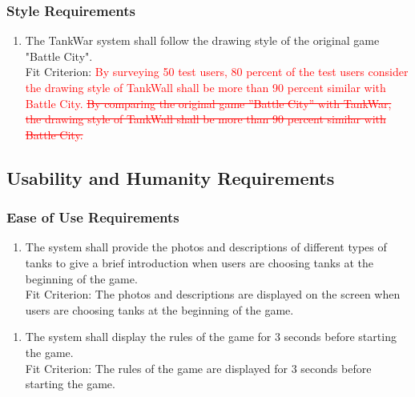 \documentclass[12pt, titlepage]{article}
\begin{document}
\subsubsection{Style Requirements}
\label{ssub:style_requirements}
\begin{enumerate}[{LF}8. ]
	\item The TankWar system shall follow the drawing style of the original game "Battle City".
	\\
	
	Fit Criterion: \textcolor{red}{By surveying 50 test users, 80 percent of the test users consider the drawing style of TankWall shall be more than 90 percent similar with Battle City. \sout{By comparing the original game ”Battle City” with TankWar, the drawing style of TankWall shall be more than 90 percent similar with Battle City.}}

\end{enumerate}

\subsection{Usability and Humanity Requirements}
\label{sub:usability_and_humanity_requirements}

\subsubsection{Ease of Use Requirements}
\label{ssub:ease_of_use_requirements}
\begin{enumerate}[{UH}1. ]
	\item The system shall provide the photos and descriptions of different types of tanks to give a brief introduction when users are choosing tanks at the beginning of the game.
	\\
	
	Fit Criterion: The photos and descriptions are displayed on the screen when users are choosing tanks at the beginning of the game.
\end{enumerate}

\begin{enumerate}[{UH}2. ]
	\item The system shall display the rules of the game for 3 seconds before starting the game.
	\\
	
	Fit Criterion: The rules of the game are displayed for 3 seconds before starting the game.
\end{enumerate}
\end{document}
